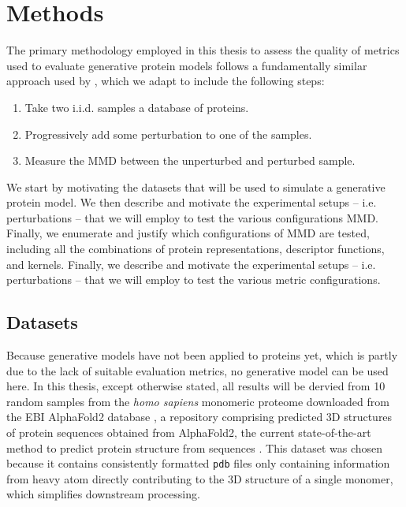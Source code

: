 \chapter{Methods}



The primary methodology employed in this thesis to assess the quality of metrics
used to evaluate generative protein models follows a fundamentally similar
approach used by \cite{o2021evaluation}, which we adapt to include the following
steps:

\begin{enumerate}
\item Take two i.i.d. samples a database of proteins.
\item Progressively add some perturbation to one of the samples.
\item Measure the MMD between the unperturbed and perturbed sample.
\end{enumerate}

We start by motivating the datasets that will be used to simulate a generative
protein model. We then describe and motivate the experimental setups -- i.e.
perturbations -- that we will employ to test the various configurations MMD.
Finally, we enumerate and justify which configurations of MMD are tested,
including all the combinations of protein representations, descriptor functions,
and kernels. Finally, we describe and motivate the experimental setups -- i.e.
perturbations -- that we will employ to test the various metric configurations.


\section{Datasets}

Because generative models have not been applied to proteins yet, which is partly
due to the lack of suitable evaluation metrics, no generative model can be used
here. In this thesis, except otherwise stated, all results will be dervied from
10 random samples from the \textit{homo sapiens} monomeric proteome downloaded
from the EBI AlphaFold2 database
\citep{varadi2022alphafold,tunyasuvunakool2021highly}, a repository comprising
predicted 3D structures of protein sequences obtained from AlphaFold2, the
current state-of-the-art method to predict protein structure from sequences
\citep{jumper2021highly}. This dataset was chosen because it contains
consistently formatted \texttt{pdb} files only containing information from
heavy atom directly contributing to the 3D structure of a single monomer, which
simplifies downstream processing.

